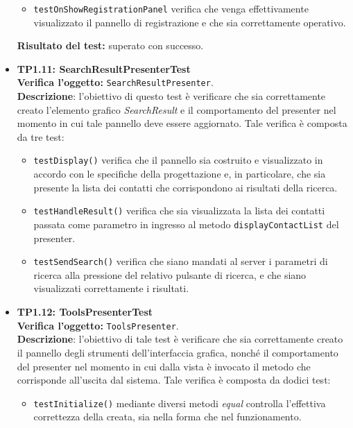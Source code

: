 \begin{itemize}
\begin{itemize}
\item \texttt{testOnShowRegistrationPanel} verifica che venga effettivamente visualizzato il pannello di registrazione e che sia correttamente operativo.

\end{itemize}
\textbf{Risultato del test:} superato con successo.

\item \textbf{TP1.11: SearchResultPresenterTest}\\
\textbf{Verifica l'oggetto:} \texttt{SearchResultPresenter}.\\
\textbf{Descrizione}: l'obiettivo di questo test è verificare che sia correttamente creato l'elemento grafico \textit{SearchResult} e il comportamento del presenter nel momento in cui tale pannello deve essere aggiornato. Tale verifica è composta da tre test:
\begin{itemize}

\item \texttt{testDisplay()} verifica che il pannello sia costruito e visualizzato in accordo con le specifiche della progettazione e, in particolare, che sia presente la lista dei contatti che corrispondono ai risultati della ricerca.

\item \texttt{testHandleResult()} verifica che sia visualizzata la lista dei contatti passata come parametro in ingresso al metodo \texttt{displayContactList} del presenter.

\item \texttt{testSendSearch()} verifica che siano mandati al server i parametri di ricerca alla pressione del relativo pulsante di ricerca, e che siano visualizzati correttamente i risultati.

\end{itemize}

\item \textbf{TP1.12: ToolsPresenterTest}\\
\textbf{Verifica l'oggetto:} \texttt{ToolsPresenter}.\\
\textbf{Descrizione}: l'obiettivo di tale test è verificare che sia correttamente creato il pannello degli strumenti dell'interfaccia grafica, nonché il comportamento del presenter nel momento in cui dalla vista è invocato il metodo che corrisponde all'uscita dal sistema.
Tale verifica è composta da dodici test:
\begin{itemize}

\item \texttt{testInitialize()} mediante diversi metodi \textit{equal} controlla l'effettiva correttezza della  creata, sia nella forma che nel funzionamento.


\end{itemize}
\end{itemize}

